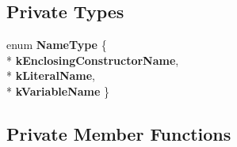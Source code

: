 \subsection*{Private Types}
\begin{DoxyCompactItemize}
\item 
enum {\bfseries Name\+Type} \{ \\*
{\bfseries k\+Enclosing\+Constructor\+Name}, 
\\*
{\bfseries k\+Literal\+Name}, 
\\*
{\bfseries k\+Variable\+Name}
 \}\hypertarget{classv8_1_1internal_1_1_func_name_inferrer_ad4d50444ca7be37ed496fe78fdea8698}{}\label{classv8_1_1internal_1_1_func_name_inferrer_ad4d50444ca7be37ed496fe78fdea8698}

\end{DoxyCompactItemize}
\subsection*{Private Member Functions}
